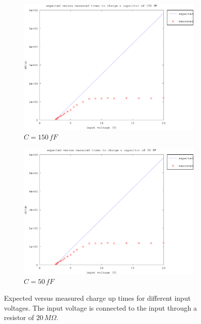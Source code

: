 \documentclass{article}
\begin{document}
\begin{figure}
\begin{subfigure}[b]{0.475\textwidth}
	    \centering 
	    \includegraphics[width=\textwidth]{fig/vin_vs_time_sat_150fF.eps}
	    \caption[]%
	    {$C=150\,fF$}    
	    \label{fig:e_vs_m_150fF}
	\end{subfigure}
	\quad
	\begin{subfigure}[b]{0.475\textwidth}   
	    \centering 
	    \includegraphics[width=\textwidth]{fig/vin_vs_time_sat_50fF.eps}
	    \caption[]%
	    {$C=50\,fF$}    
	    \label{fig:e_vs_m_50fF}
	\end{subfigure}
	\caption{Expected versus measured charge up times for different input voltages. The input voltage is connected to the input through a resistor of $20\,M\Omega$.}
	\label{fig:e_vs_m}
\end{figure}
\end{document}
